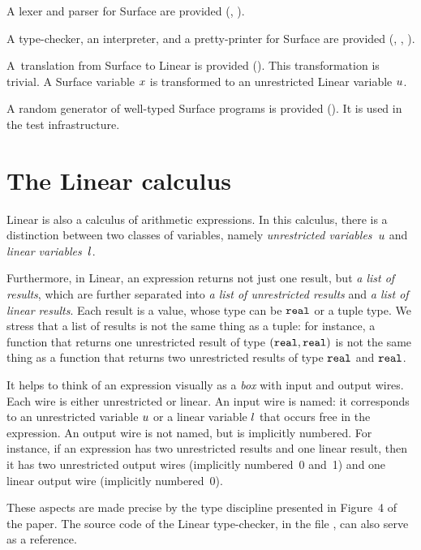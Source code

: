 \documentclass{article}
\begin{document}
A lexer and parser for Surface are provided
(, ).

A type-checker, an interpreter, and a pretty-printer for Surface are provided
(, , ).

A~translation from Surface to Linear is provided (). This
transformation is trivial. A Surface variable $x$ is transformed to an
unrestricted Linear variable $u$.

A random generator of well-typed Surface programs is provided
(). It is used in the test infrastructure.


\section{The Linear calculus}

Linear is also a calculus of arithmetic expressions.
%
In this calculus, there is a distinction between two classes of variables,
namely \emph{unrestricted variables~$u$} and \emph{linear variables~$l$}.

Furthermore, in Linear, an expression returns not just one result, but
\emph{a list of results}, which are further separated into \emph{a list of
  unrestricted results} and \emph{a list of linear results}. Each result is a
value, whose type can be $\text{\texttt{real}}$ or a tuple type. We stress that a list of
results is not the same thing as a tuple: for instance, a function that
returns one unrestricted result of type $(\text{\texttt{real}}, \text{\texttt{real}})$ is not the same thing
as a function that returns two unrestricted results of type $\text{\texttt{real}}$ and
$\text{\texttt{real}}$.

It helps to think of an expression visually as a \emph{box} with input and
output wires. Each wire is either unrestricted or linear. An input wire is
named: it corresponds to an unrestricted variable $u$ or a linear variable
$l$ that occurs free in the expression. An output wire is not named, but is
implicitly numbered. For instance, if an expression has two unrestricted
results and one linear result, then it has two unrestricted output wires
(implicitly numbered~0 and~1) and one linear output wire (implicitly
numbered~0).

These aspects are made precise by the type discipline presented in Figure~4 of
the paper. The source code of the Linear type-checker, in the file
, can also serve as a reference.
\end{document}
